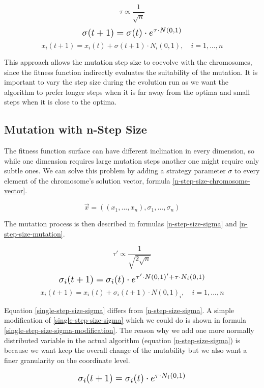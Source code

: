 \begin{equation}
    \tau \propto \frac{1}{\sqrt{n}}
\end{equation}
\begin{equation} \label{single-step-size-sigma} \scalebox{1.3}{
    $\sigma(t+1) = \sigma(t) \cdot e^{\tau \cdot N(0,1)}$
}
\end{equation}
\begin{equation} \label{single-step-size-mutation}
    x_i(t+1) = x_i(t) + \sigma(t+1) \cdot N_i(0,1), \quad i = 1,...,n
\end{equation}

This approach allows the mutation step size to coevolve with the chromosomes, since the fitness function indirectly evaluates the suitability of the mutation. It is important to vary the step size during the evolution run as we want the algorithm to prefer longer steps when it is far away from the optima and small steps when it is close to the optima.

\subsection{Mutation with n-Step Size}
The fitness function surface can have different inclination in every dimension, so while one dimension requires large mutation steps another one might require only subtle ones. We can solve this problem by adding a strategy parameter $\sigma$ to every element of the chromosome's solution vector, formula \ref{n-step-size-chromosome-vector}.

 \begin{equation} \label{n-step-size-chromosome-vector}
    \vec{x} = ((x_1,...,x_n), \sigma_1,...,\sigma_n)
 \end{equation}

 The mutation process is then described in formulas \ref{n-step-size-sigma} and \ref{n-step-size-mutation}.

\begin{equation}
\tau' \propto \frac{1}{\sqrt{2\sqrt{n}}}
\end{equation}
\begin{equation} \label{n-step-size-sigma} \scalebox{1.3}{
    $\sigma_i(t+1) = \sigma_i(t) \cdot e^{\tau' \cdot N(0,1)' + \tau \cdot N_i(0,1)}$
}
\end{equation}
\begin{equation} \label{n-step-size-mutation}
    x_i(t+1) = x_i(t) + \sigma_i(t+1) \cdot N(0,1)_i, \quad i = 1,...,n
\end{equation}

Equation \ref{single-step-size-sigma} differs from \ref{n-step-size-sigma}. A simple modification of \ref{single-step-size-sigma} which we could do is shown in formula \ref{single-step-size-sigma-modification}. The reason why we add one more normally distributed variable in the actual algorithm (equation \ref{n-step-size-sigma}) is because we want keep the overall change of the mutability but we also want a finer granularity on the coordinate level.

\begin{equation}\label{single-step-size-sigma-modification}
\scalebox{1.3}{
    $\sigma_i(t+1) = \sigma_i(t) \cdot e^{\tau \cdot N_i(0,1)}$
}
\end{equation}
